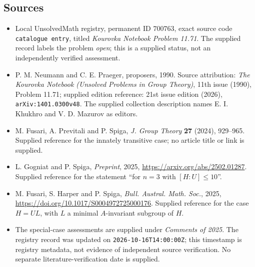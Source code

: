 \documentclass[11pt]{article}
\begin{document}
\subsection{Sources}
\begin{itemize}
\item Local UnsolvedMath registry, permanent ID \(700763\), exact source code \texttt{catalogue entry}, titled \emph{Kourovka Notebook Problem 11.71}. The supplied record labels the problem \emph{open}; this is a supplied status, not an independently verified assessment.
\item P. M. Neumann and C. E. Praeger, proposers, 1990. Source attribution: \emph{The Kourovka Notebook (Unsolved Problems in Group Theory)}, 11th issue (1990), Problem 11.71; supplied edition reference: 21st issue edition (2026), \texttt{arXiv:1401.0300v48}. The supplied collection description names E. I. Khukhro and V. D. Mazurov as editors.
\item M. Fusari, A. Previtali and P. Spiga, \emph{J. Group Theory} \textbf{27} (2024), 929--965. Supplied reference for the innately transitive case; no article title or link is supplied.
\item L. Gogniat and P. Spiga, \emph{Preprint}, 2025, \url{https://arxiv.org/abs/2502.01287}. Supplied reference for the statement ``for \(n=3\) with \([H:U]\leq10\)''.
\item M. Fusari, S. Harper and P. Spiga, \emph{Bull. Austral. Math. Soc.}, 2025, \url{https://doi.org/10.1017/S0004972725000176}. Supplied reference for the case \(H=UL\), with \(L\) a minimal \(A\)-invariant subgroup of \(H\).
\item The special-case assessments are supplied under \emph{Comments of 2025}. The registry record was updated on \texttt{2026-10-16T14:00:00Z}; this timestamp is registry metadata, not evidence of independent source verification. No separate literature-verification date is supplied.
\end{itemize}
\end{document}
